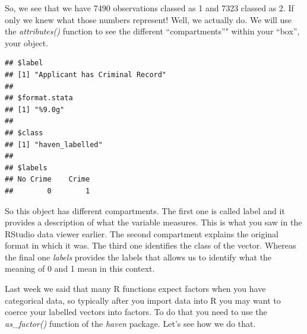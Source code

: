 \documentclass[]{book}
\newenvironment{Shaded}{\begin{snugshade}}{\end{snugshade}}
\newcommand{\CommentTok}[1]{\textcolor[rgb]{0.56,0.35,0.01}{\textit{#1}}}
\newcommand{\KeywordTok}[1]{\textcolor[rgb]{0.13,0.29,0.53}{\textbf{#1}}}
\newcommand{\NormalTok}[1]{#1}
\newcommand{\OperatorTok}[1]{\textcolor[rgb]{0.81,0.36,0.00}{\textbf{#1}}}
\newcommand{\StringTok}[1]{\textcolor[rgb]{0.31,0.60,0.02}{#1}}
\theoremstyle{definition}
\theoremstyle{definition}
\theoremstyle{definition}
\theoremstyle{remark}
\begin{document}
So, we see that we have 7490 observations classed as 1 and 7323 classed
as 2. If only we knew what those numbers represent! Well, we actually
do. We will use the \emph{attributes()} function to see the different
``compartments''" within your ``box'', your object.

\begin{Shaded}
\end{Shaded}

\begin{verbatim}
## $label
## [1] "Applicant has Criminal Record"
## 
## $format.stata
## [1] "%9.0g"
## 
## $class
## [1] "haven_labelled"
## 
## $labels
## No Crime    Crime 
##        0        1
\end{verbatim}

So this object has different compartments. The first one is called label
and it provides a description of what the variable measures. This is
what you saw in the RStudio data viewer earlier. The second compartment
explains the original format in which it was. The third one identifies
the class of the vector. Whereas the final one \emph{labels} provides
the labels that allows us to identify what the meaning of 0 and 1 mean
in this context.

Last week we said that many R functions expect factors when you have
categorical data, so typically after you import data into R you may want
to coerce your labelled vectors into factors. To do that you need to use
the \emph{as\_factor()} function of the \emph{haven} package. Let's see
how we do that.

\begin{Shaded}
\end{Shaded}
\end{document}
